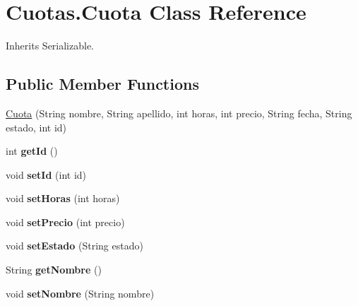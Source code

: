\hypertarget{class_cuotas_1_1_cuota}{}\section{Cuotas.\+Cuota Class Reference}
\label{class_cuotas_1_1_cuota}


Inherits Serializable.

\subsection*{Public Member Functions}
\begin{DoxyCompactItemize}
\item 
\hyperlink{class_cuotas_1_1_cuota_a23fd33a1cefcc811bff2f5b998c29295}{Cuota} (String nombre, String apellido, int horas, int precio, String fecha, String estado, int id)
\item 
\mbox{\label{class_cuotas_1_1_cuota_ae5e8b03c4a90c85a4a7d335c53ed13bf}} 
int {\bfseries get\+Id} ()
\item 
\mbox{\label{class_cuotas_1_1_cuota_ac973f24b366975821dcd73f8adb74966}} 
void {\bfseries set\+Id} (int id)
\item 
\mbox{\label{class_cuotas_1_1_cuota_a4712f4a7f56bbbd9496d10549846bc09}} 
void {\bfseries set\+Horas} (int horas)
\item 
\mbox{\label{class_cuotas_1_1_cuota_ad4a4cd1426e74b8ef97abd2d24b8a8e1}} 
void {\bfseries set\+Precio} (int precio)
\item 
\mbox{\label{class_cuotas_1_1_cuota_af21418197d25d7f33313142dd7cb114b}} 
void {\bfseries set\+Estado} (String estado)
\item 
\mbox{\label{class_cuotas_1_1_cuota_ad23277420919719af619cf72f704df3b}} 
String {\bfseries get\+Nombre} ()
\item 
\mbox{\label{class_cuotas_1_1_cuota_aff842c56e7b0e45c6d7731b8f6019d21}} 
void {\bfseries set\+Nombre} (String nombre)
\item 
\mbox{\label{class_cuotas_1_1_cuota_ac68ccffc75be716059b43928be2e6bd5}} 

\end{DoxyCompactItemize}
